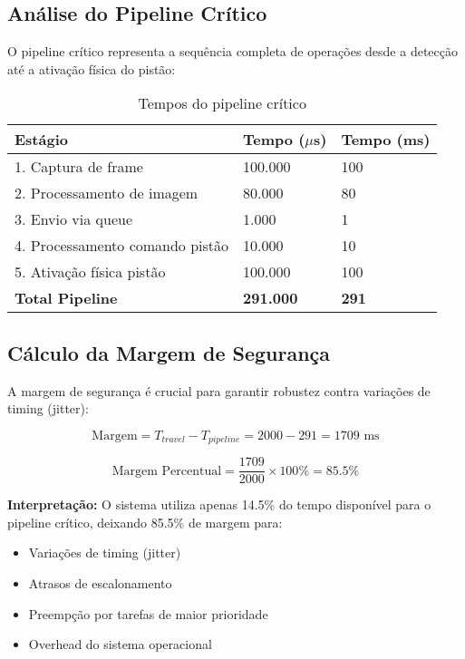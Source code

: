 \documentclass[12pt,a4paper]{article}
\begin{document}
\subsection{Análise do Pipeline Crítico}

O pipeline crítico representa a sequência completa de operações desde a detecção até a ativação física do pistão:

\begin{table}[H]
\centering
\begin{tabularx}{\textwidth}{Xll}
\toprule
\textbf{Estágio} & \textbf{Tempo ($\mu$s)} & \textbf{Tempo (ms)} \\
\midrule
1. Captura de frame & 100.000 & 100 \\
2. Processamento de imagem & 80.000 & 80 \\
3. Envio via queue & 1.000 & 1 \\
4. Processamento comando pistão & 10.000 & 10 \\
5. Ativação física pistão & 100.000 & 100 \\
\midrule
\textbf{Total Pipeline} & \textbf{291.000} & \textbf{291} \\
\bottomrule
\end{tabularx}
\caption{Tempos do pipeline crítico}
\end{table}

\subsection{Cálculo da Margem de Segurança}

A margem de segurança é crucial para garantir robustez contra variações de timing (jitter):

\begin{equation}
\text{Margem} = T_{travel} - T_{pipeline} = 2000 - 291 = 1709 \text{ ms}
\end{equation}

\begin{equation}
\text{Margem Percentual} = \frac{1709}{2000} \times 100\% = 85.5\%
\end{equation}

\textbf{Interpretação:} O sistema utiliza apenas 14.5\% do tempo disponível para o pipeline crítico, deixando 85.5\% de margem para:
\begin{itemize}
    \item Variações de timing (jitter)
    \item Atrasos de escalonamento
    \item Preempção por tarefas de maior prioridade
    \item Overhead do sistema operacional
\end{itemize}
\end{document}
